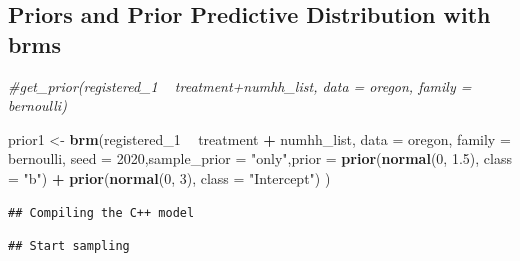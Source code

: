 \documentclass[]{article}
\newenvironment{Shaded}{\begin{snugshade}}{\end{snugshade}}
\newcommand{\CommentTok}[1]{\textcolor[rgb]{0.56,0.35,0.01}{\textit{#1}}}
\newcommand{\DataTypeTok}[1]{\textcolor[rgb]{0.13,0.29,0.53}{#1}}
\newcommand{\DecValTok}[1]{\textcolor[rgb]{0.00,0.00,0.81}{#1}}
\newcommand{\FloatTok}[1]{\textcolor[rgb]{0.00,0.00,0.81}{#1}}
\newcommand{\KeywordTok}[1]{\textcolor[rgb]{0.13,0.29,0.53}{\textbf{#1}}}
\newcommand{\NormalTok}[1]{#1}
\newcommand{\OperatorTok}[1]{\textcolor[rgb]{0.81,0.36,0.00}{\textbf{#1}}}
\newcommand{\StringTok}[1]{\textcolor[rgb]{0.31,0.60,0.02}{#1}}
\begin{document}
\hypertarget{priors-and-prior-predictive-distribution-with-brms}{%
\subsection{Priors and Prior Predictive Distribution with
brms}\label{priors-and-prior-predictive-distribution-with-brms}}

\begin{Shaded}
\begin{Highlighting}[]
\CommentTok{#get_prior(registered_1 ~ treatment+numhh_list, data = oregon, family =  bernoulli)}

\NormalTok{prior1 <-}\StringTok{ }\KeywordTok{brm}\NormalTok{(registered_}\DecValTok{1} \OperatorTok{~}\StringTok{ }\NormalTok{treatment }\OperatorTok{+}\StringTok{ }\NormalTok{numhh_list, }\DataTypeTok{data =}\NormalTok{ oregon, }\DataTypeTok{family =}\NormalTok{ bernoulli, }\DataTypeTok{seed =} \DecValTok{2020}\NormalTok{,}\DataTypeTok{sample_prior =} \StringTok{"only"}\NormalTok{,}\DataTypeTok{prior =} 
                \KeywordTok{prior}\NormalTok{(}\KeywordTok{normal}\NormalTok{(}\DecValTok{0}\NormalTok{, }\FloatTok{1.5}\NormalTok{), }\DataTypeTok{class =} \StringTok{"b"}\NormalTok{) }\OperatorTok{+}\StringTok{ }
\StringTok{                }\KeywordTok{prior}\NormalTok{(}\KeywordTok{normal}\NormalTok{(}\DecValTok{0}\NormalTok{, }\DecValTok{3}\NormalTok{), }\DataTypeTok{class =} \StringTok{"Intercept"}\NormalTok{) )}
\end{Highlighting}
\end{Shaded}

\begin{verbatim}
## Compiling the C++ model
\end{verbatim}

\begin{verbatim}
## Start sampling
\end{verbatim}
\end{document}
